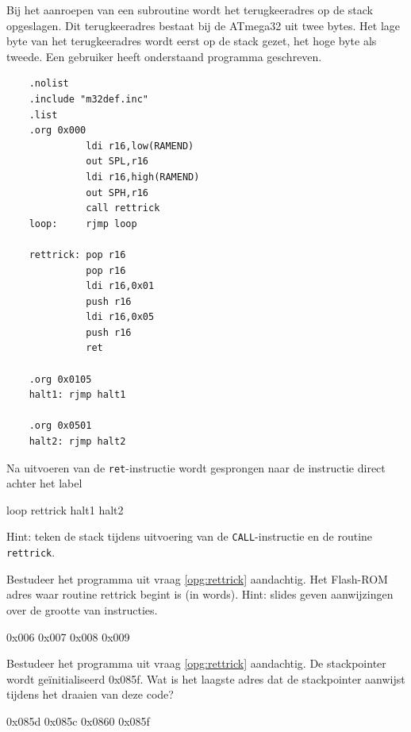 \documentclass[a4paper,12pt,fleqn,dutch]{tisdexam}
\begin{document}
\begin{questions}
\question
\label{opg:opg22}
\label{opg:rettrick}
Bij het aanroepen van een subroutine wordt het terugkeeradres op de stack opgeslagen. Dit
terugkeeradres bestaat bij de ATmega32 uit twee bytes. Het lage byte van het terugkeeradres
wordt eerst op de stack gezet, het hoge byte als tweede. Een gebruiker heeft onderstaand
programma geschreven.
\begin{verbatim}
    .nolist
    .include "m32def.inc"
    .list
    .org 0x000
              ldi r16,low(RAMEND)
              out SPL,r16
              ldi r16,high(RAMEND)
              out SPH,r16
              call rettrick
    loop:     rjmp loop
    
    rettrick: pop r16
              pop r16
              ldi r16,0x01
              push r16
              ldi r16,0x05
              push r16
              ret

    .org 0x0105
    halt1: rjmp halt1
    
    .org 0x0501
    halt2: rjmp halt2
\end{verbatim}
Na uitvoeren van de \texttt{ret}-instructie wordt gesprongen naar de instructie direct achter het label
\begin{choices}
	\choice loop
	\choice rettrick
	\choice halt1
	\CorrectChoice \label{ans:opg22} halt2
\end{choices}
Hint: teken de stack tijdens uitvoering van de \texttt{CALL}-instructie en de routine \texttt{rettrick}.


\question
\label{opg:opg23}
Bestudeer het programma uit vraag \ref{opg:rettrick} aandachtig. Het Flash-ROM adres waar routine
rettrick begint is (in words). Hint: slides geven aanwijzingen over de grootte van instructies.
\begin{choices}
	\choice 0x006
	\CorrectChoice \label{ans:opg23} 0x007
	\choice 0x008
	\choice 0x009
\end{choices}


\question
\label{opg:opg24}
Bestudeer het programma uit vraag \ref{opg:rettrick} aandachtig. De
stackpointer wordt ge\"{i}nitialiseerd 0x085f. Wat is het laagste adres dat de
stackpointer aanwijst tijdens het draaien van deze code?
\begin{choices}
	\CorrectChoice \label{ans:opg24} 0x085d
	\choice 0x085c
	\choice 0x0860
	\choice 0x085f
\end{choices}






%


\end{questions}
\end{document}
